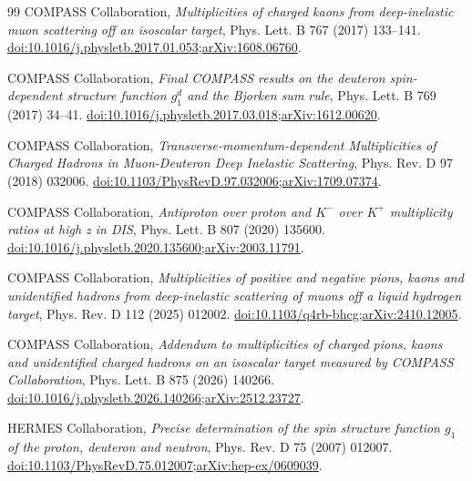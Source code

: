\documentclass[11pt,a4paper]{article}
\begin{document}
\begin{thebibliography}{99}
 COMPASS Collaboration,
\emph{Multiplicities of charged kaons from deep-inelastic muon scattering off an isoscalar target},
Phys. Lett. B 767 (2017) 133--141.
\href{https://doi.org/10.1016/j.physletb.2017.01.053}{doi:10.1016/j.physletb.2017.01.053};\quad\href{https://arxiv.org/abs/1608.06760}{arXiv:1608.06760}.

 COMPASS Collaboration,
\emph{Final COMPASS results on the deuteron spin-dependent structure function $g_1^d$ and the Bjorken sum rule},
Phys. Lett. B 769 (2017) 34--41.
\href{https://doi.org/10.1016/j.physletb.2017.03.018}{doi:10.1016/j.physletb.2017.03.018};\quad\href{https://arxiv.org/abs/1612.00620}{arXiv:1612.00620}.

 COMPASS Collaboration,
\emph{Transverse-momentum-dependent Multiplicities of Charged Hadrons in Muon-Deuteron Deep Inelastic Scattering},
Phys. Rev. D 97 (2018) 032006.
\href{https://doi.org/10.1103/PhysRevD.97.032006}{doi:10.1103/PhysRevD.97.032006};\quad\href{https://arxiv.org/abs/1709.07374}{arXiv:1709.07374}.

 COMPASS Collaboration,
\emph{Antiproton over proton and $K^-$ over $K^+$ multiplicity ratios at high z in DIS},
Phys. Lett. B 807 (2020) 135600.
\href{https://doi.org/10.1016/j.physletb.2020.135600}{doi:10.1016/j.physletb.2020.135600};\quad\href{https://arxiv.org/abs/2003.11791}{arXiv:2003.11791}.

 COMPASS Collaboration,
\emph{Multiplicities of positive and negative pions, kaons and unidentified hadrons from deep-inelastic scattering of muons off a liquid hydrogen target},
Phys. Rev. D 112 (2025) 012002.
\href{https://doi.org/10.1103/q4rb-bhcg}{doi:10.1103/q4rb-bhcg};\quad\href{https://arxiv.org/abs/2410.12005}{arXiv:2410.12005}.

 COMPASS Collaboration,
\emph{Addendum to multiplicities of charged pions, kaons and unidentified charged hadrons on an isoscalar target measured by COMPASS Collaboration},
Phys. Lett. B 875 (2026) 140266.
\href{https://doi.org/10.1016/j.physletb.2026.140266}{doi:10.1016/j.physletb.2026.140266};\quad\href{https://arxiv.org/abs/2512.23727}{arXiv:2512.23727}.

 HERMES Collaboration,
\emph{Precise determination of the spin structure function $g_1$ of the proton, deuteron and neutron},
Phys. Rev. D 75 (2007) 012007.
\href{https://doi.org/10.1103/PhysRevD.75.012007}{doi:10.1103/PhysRevD.75.012007};\quad\href{https://arxiv.org/abs/hep-ex/0609039}{arXiv:hep-ex/0609039}.


\end{thebibliography}
\end{document}
